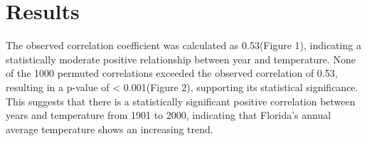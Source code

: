 \documentclass[a4paper]{article}
\begin{document}
\section*{Results}
The observed correlation coefficient was calculated as 0.53(Figure 1), indicating a statistically moderate positive relationship between year and temperature. None of the 1000 permuted correlations exceeded the observed correlation of 0.53, resulting in a p-value of < 0.001(Figure 2), supporting its statistical significance. This suggests that there is a statistically significant positive correlation between years and temperature from 1901 to 2000, indicating that Florida's annual average temperature shows an increasing trend.
\end{document}

